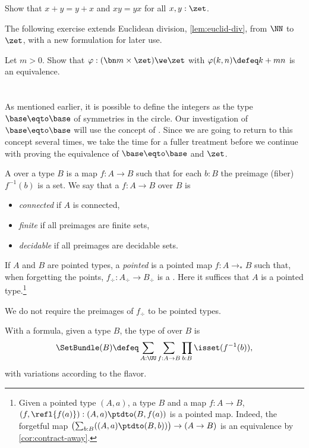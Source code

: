 \begin{xca}\label{xca:commutative-add-Z}
  Show that $x+y = y+x$ and $xy=yx$ for all $x,y:\zet$.
\end{xca}

The following exercise extends Euclidean division, \cref{lem:euclid-div},
from $\NN$ to $\zet$, with a new formulation for later use.

\begin{xca}\label{xca:euclid-div-Z}
Let $m>0$. Show that $\varphi: (\bn m\times \zet)\we\zet$ with 
$\varphi(k,n)\defeq k+mn$ is an equivalence.
\end{xca}


\section{\Coverings}
\label{sec:covering}

As mentioned earlier, it is possible to define the integers as the
type $\base\eqto\base$ of symmetries in the circle.
Our investigation of $\base\eqto\base$ will use the concept of \coverings.
Since we are going to return to this concept several times,
we take the time for a fuller treatment before we continue with
proving the equivalence of $\base\eqto\base$ and $\zet$.

\begin{definition}\label{def:covering}
A \emph{\covering} over a type $B$
is a map $f:A\to B$ such that for each $b:B$ the preimage
(fiber) $f^{-1}(b)$ is a set.
We say that a \covering $f:A\to B$ over $B$ is
\begin{itemize}
\item \emph{connected} if $A$ is connected,
\item \emph{finite} if all preimages are finite sets,
\item \emph{decidable} if all preimages are decidable sets.
\end{itemize}

If $A$ and $B$ are pointed types, a \emph{pointed} \covering is a pointed map
$f:A\to_*B$ such that, when forgetting the points, $f_\div:A_\div\to B_\div$
is a \covering. Here it suffices that $A$ is a pointed type.\footnote{%
  Given a pointed type $(A,a)$, a type $B$ and a map $f : A \to B$,
  $(f,\refl{f(a)}) : (A,a) \ptdto (B,f(a))$ is a pointed map.
  Indeed, the forgetful map $\bigl(\sum_{b:B}((A,a)\ptdto(B,b))\bigr)
  \to (A \to B)$ is an equivalence by \cref{cor:contract-away}.}

We do not require the preimages of $f_\div$ to be pointed types.
\end{definition}
With a formula, given a type $B$, the type of \coverings over $B$ is
\[
\SetBundle(B) \defeq \sum_{A:\UU}\sum_{f:A\to B}\prod_{b:B}\isset(f^{-1}(b)),
\]
with variations according to the flavor.

